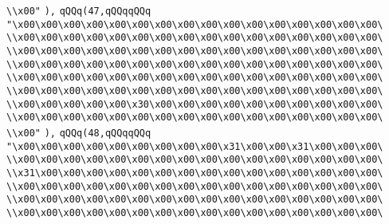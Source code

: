 \verb|\\x00"|\newline
\verb|),|\newline
\verb|qQQq(47,qQQqqQQq|\newline
\verb|"\x00\x00\x00\x00\x00\x00\x00\x00\x00\x00\x00\x00\x00\x00\x00\x00\|\newline
\verb|\\x00\x00\x00\x00\x00\x00\x00\x00\x00\x00\x00\x00\x00\x00\x00\x00\|\newline
\verb|\\x00\x00\x00\x00\x00\x00\x00\x00\x00\x00\x00\x00\x00\x00\x00\x00\|\newline
\verb|\\x00\x00\x00\x00\x00\x00\x00\x00\x00\x00\x00\x00\x00\x00\x00\x00\|\newline
\verb|\\x00\x00\x00\x00\x00\x00\x00\x00\x00\x00\x00\x00\x00\x00\x00\x00\|\newline
\verb|\\x00\x00\x00\x00\x00\x00\x00\x00\x00\x00\x00\x00\x00\x00\x00\x00\|\newline
\verb|\\x00\x00\x00\x00\x00\x30\x00\x00\x00\x00\x00\x00\x00\x00\x00\x00\|\newline
\verb|\\x00\x00\x00\x00\x00\x00\x00\x00\x00\x00\x00\x00\x00\x00\x00\x00\|\newline
\verb|\\x00"|\newline
\verb|),|\newline
\verb|qQQq(48,qQQqqQQq|\newline
\verb|"\x00\x00\x00\x00\x00\x00\x00\x00\x00\x31\x00\x00\x31\x00\x00\x00\|\newline
\verb|\\x00\x00\x00\x00\x00\x00\x00\x00\x00\x00\x00\x00\x00\x00\x00\x00\|\newline
\verb|\\x31\x00\x00\x00\x00\x00\x00\x00\x00\x00\x00\x00\x00\x00\x00\x00\|\newline
\verb|\\x00\x00\x00\x00\x00\x00\x00\x00\x00\x00\x00\x00\x00\x00\x00\x00\|\newline
\verb|\\x00\x00\x00\x00\x00\x00\x00\x00\x00\x00\x00\x00\x00\x00\x00\x00\|\newline
\verb|\\x00\x00\x00\x00\x00\x00\x00\x00\x00\x00\x00\x00\x00\x00\x00\x00\|\newline
